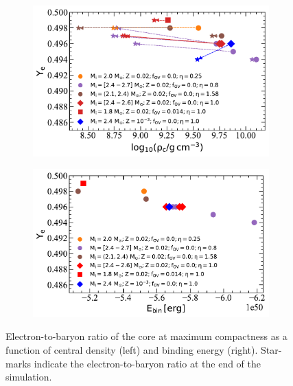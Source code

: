 \documentclass[main.tex]{subfiles}
\begin{document}
\begin{figure}[h!]
    \centering
    \begin{subfigure}{0.5\textwidth}
      \centering
      \includegraphics[width=0.95\columnwidth]{figures/chapter2/Ye-rho/ye_rho.pdf}
    \end{subfigure}%
    \begin{subfigure}{0.5\textwidth}
      \centering
      \includegraphics[width=0.95\columnwidth]{figures/chapter2/Ye-rho/ye_ebin.pdf}
    \end{subfigure}
    \caption{Electron-to-baryon ratio of the core at maximum compactness as a function of central density (left) and binding energy (right). Star-marks indicate the electron-to-baryon ratio at the end of the simulation.}
    \label{fig:composition_series2}
\end{figure}
\end{document}

